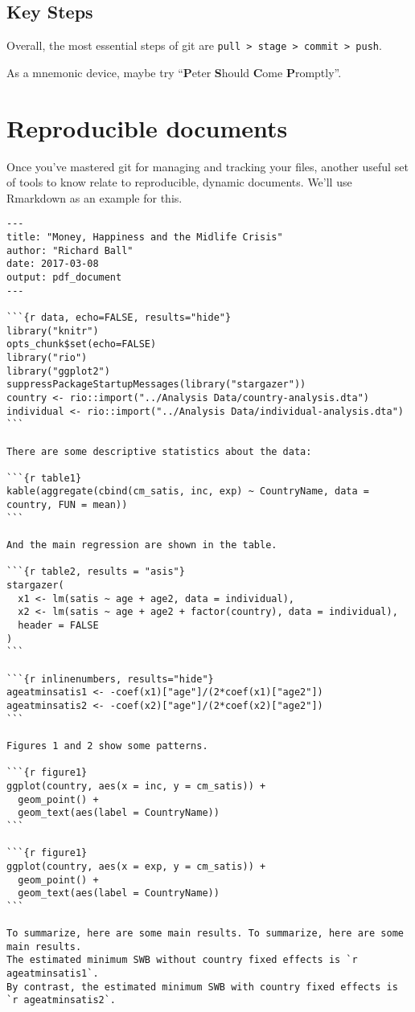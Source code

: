 \documentclass[12pt, a4paper]{article}
\begin{document}
\subsection*{Key Steps}

Overall, the most essential steps of git are \texttt{pull > stage > commit > push}.

\noindent As a mnemonic device, maybe try ``\textbf{P}eter \textbf{S}hould \textbf{C}ome \textbf{P}romptly''.


\clearpage
\section{Reproducible documents}

Once you've mastered git for managing and tracking your files, another useful set of tools to know relate to reproducible, dynamic documents. We'll use Rmarkdown as an example for this.

\footnotesize 
\begin{verbatim}
---
title: "Money, Happiness and the Midlife Crisis"
author: "Richard Ball"
date: 2017-03-08
output: pdf_document
---

```{r data, echo=FALSE, results="hide"}
library("knitr")
opts_chunk$set(echo=FALSE)
library("rio")
library("ggplot2")
suppressPackageStartupMessages(library("stargazer"))
country <- rio::import("../Analysis Data/country-analysis.dta")
individual <- rio::import("../Analysis Data/individual-analysis.dta")
```

There are some descriptive statistics about the data:

```{r table1}
kable(aggregate(cbind(cm_satis, inc, exp) ~ CountryName, data = country, FUN = mean))
```

And the main regression are shown in the table.

```{r table2, results = "asis"}
stargazer(
  x1 <- lm(satis ~ age + age2, data = individual),
  x2 <- lm(satis ~ age + age2 + factor(country), data = individual),
  header = FALSE
)
```

```{r inlinenumbers, results="hide"}
ageatminsatis1 <- -coef(x1)["age"]/(2*coef(x1)["age2"])
ageatminsatis2 <- -coef(x2)["age"]/(2*coef(x2)["age2"])
```

Figures 1 and 2 show some patterns.

```{r figure1}
ggplot(country, aes(x = inc, y = cm_satis)) + 
  geom_point() + 
  geom_text(aes(label = CountryName))
```

```{r figure1}
ggplot(country, aes(x = exp, y = cm_satis)) + 
  geom_point() + 
  geom_text(aes(label = CountryName))
```
  
To summarize, here are some main results. To summarize, here are some main results. 
The estimated minimum SWB without country fixed effects is `r ageatminsatis1`.
By contrast, the estimated minimum SWB with country fixed effects is `r ageatminsatis2`.
\end{verbatim}
\end{document}
